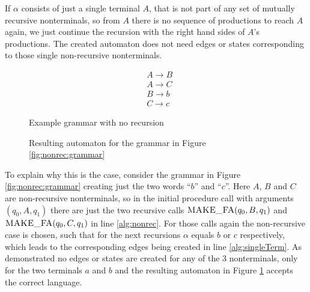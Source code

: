 If $\alpha$ consists of just a single terminal $A$, that is not part of any set of mutually recursive nonterminals, so from $A$ there is no sequence of productions to reach $A$ again, we just continue the recursion with the right hand sides of $A$'s productions. The created automaton does not need edges or states corresponding to those single non-recursive nonterminals. 


\begin{figure}[!h]
	\begin{minipage}[b]{.45\linewidth}
		\begin{align*}
			&A \rightarrow B\\
			&A \rightarrow C\\
			&B \rightarrow b\\
			&C \rightarrow c
		\end{align*}
		\caption{Example grammar with no recursion}
		\label{fig:nonrec:grammar}
	\end{minipage}
	\hfill
	\begin{minipage}[b]{.45\linewidth}
		\caption{Resulting automaton for the grammar in Figure \ref{fig:nonrec:grammar}}
		\label{fig:nonrec:automaton}
	\end{minipage}
\end{figure}


To explain why this is the case, consider the grammar in Figure \ref{fig:nonrec:grammar} creating just the two words \enquote{$b$} and \enquote{$c$}. Here $A$, $B$ and $C$ are non-recursive nonterminals, so in the initial procedure call with arguments $(q_0, A, q_1)$ there are just the two recursive calls $\textproc{MAKE\_FA}(q_0, B, q_1)$ and $\textproc{MAKE\_FA}(q_0, C, q_1)$ in line \ref{alg:nonrec}. For those calls again the non-recursive case is chosen, such that for the next recursions $\alpha$ equals $b$ or $c$ respectively, which leads to the corresponding edges being created in line \ref{alg:singleTerm}. As demonstrated no edges or states are created for any of the 3 nonterminals, only for the two terminals $a$ and $b$ and the resulting automaton in Figure \ref{fig:nonrec:automaton} accepts the correct language.

